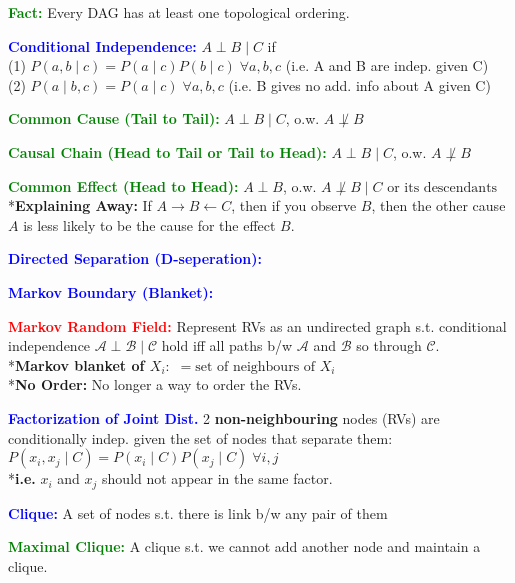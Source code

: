 \documentclass[5pt]{extarticle} %
\begin{document}
\begin{paracol}{3}
{    \textcolor{green}{\textbf{Fact:}} Every DAG has at least one topological ordering. 

    \textcolor{blue}{\textbf{Conditional Independence:}} $A \perp B \mid C$ if \\
    (1) $P(a,b \mid c) = P(a \mid c) P(b \mid c) \; \forall a,b,c$ (i.e. A and B are indep. given C) \\
    (2) $P(a \mid b,c) = P(a \mid c) \; \forall a,b,c$ (i.e. B gives no add. info about A given C)

    \textcolor{green}{\textbf{Common Cause (Tail to Tail):}} $A \perp B \mid C$, o.w. $A \not\perp B$ 

    \textcolor{green}{\textbf{Causal Chain (Head to Tail or Tail to Head):}} $A \perp B \mid C$, o.w. $A \not\perp B$

    \textcolor{green}{\textbf{Common Effect (Head to Head):}} $A \perp B$, o.w. $A \not\perp B \mid C \text{ or its descendants}$ \\
    *\textbf{Explaining Away:} If $A \rightarrow B \leftarrow C$, then if you observe $B$, then the other cause $A$ is less likely to be the cause for the effect $B$.

    \textcolor{blue}{\textbf{Directed Separation (D-seperation):}} 

    \textcolor{blue}{\textbf{Markov Boundary (Blanket):}}

    \textcolor{red}{\textbf{Markov Random Field:}} Represent RVs as an undirected graph s.t. conditional independence $\mathcal{A} \perp \mathcal{B} \mid \mathcal{C}$ hold iff all paths b/w $\mathcal{A}$ and $\mathcal{B}$ so through $\mathcal{C}$. \\
    *\textbf{Markov blanket of $X_i:$} $= \text{set of neighbours of } X_i$ \\
    *\textbf{No Order:} No longer a way to order the RVs.

    \textcolor{blue}{\textbf{Factorization of Joint Dist.}} 2 \textbf{non-neighbouring} nodes (RVs) are conditionally indep. given the set of nodes that separate them: \\
    $P(x_i, x_j \mid C) = P(x_i \mid C) P(x_j \mid C) \; \forall i,j$ \\
    *\textbf{i.e.} $x_i$ and $x_j$ should not appear in the same factor. 

    \textcolor{blue}{\textbf{Clique:}} A set of nodes s.t. there is link b/w any pair of them

    \textcolor{green}{\textbf{Maximal Clique:}} A clique s.t. we cannot add another node and maintain a clique. 

}
\end{paracol}
\end{document}
